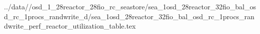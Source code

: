 ../data//osd_1_28reactor_28fio_rc_seastore/sea_1osd_28reactor_32fio_bal_osd_rc_1procs_randwrite_d/sea_1osd_28reactor_32fio_bal_osd_rc_1procs_randwrite_perf_reactor_utilization_table.tex
